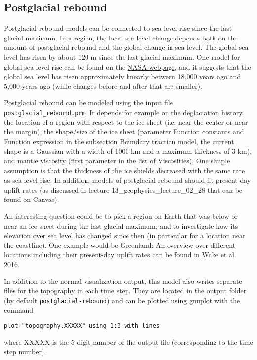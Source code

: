 \documentclass[notitlepage]{article}
\begin{document}
\subsection{Postglacial rebound}

Postglacial rebound models can be connected to sea-level rise since the last glacial maximum. 
In a region, the local sea level change depends both on the amount of postglacial rebound and the global change in sea level. 
The global sea level has risen by about 120 m since the last glacial maximum. One model for global sea level rise
can be found on the \href{https://www.giss.nasa.gov/research/briefs/gornitz_09/}{NASA webpage}, and it suggests that 
the global sea level has risen approximately linearly between 18,000 years ago and 5,000 years ago (while changes before
and after that are smaller). 

Postglacial rebound can be modeled using the input file \texttt{postglacial\_rebound.prm}. 
It depends for example on the deglaciation history, the location of a region with respect to the ice sheet 
(i.e. near the center or near the margin), the shape/size of the ice sheet (parameter Function constants and 
Function expression in the subsection Boundary traction model, the current shape is a Gaussian with a width of 
1000 km and a maximum thickness of 3 km), and mantle viscosity (first parameter in the list of Viscosities). 
One simple assumption is that the thickness of the ice shields decreased with the same rate as sea level rise. 
In addition, models of postglacial rebound should fit present-day uplift rates (as discussed in lecture 
13\_geophysics\_lecture\_02\_28 that can be found on Canvas). 

An interesting question could be to pick a region on Earth that was below or near an ice sheet during the last 
glacial maximum, and to investigate how its elevation over sea level has changed since then (in particular for
a location near the coastline). One example would be Greenland: An overview over different locations including their
present-day uplift rates can be found in \href{https://link.springer.com/article/10.1007/s40641-016-0040-z}{Wake et al. 2016}. 

In addition to the normal visualization output, this model also writes separate files for the topography in each time step. 
They are located in the output folder (by default \texttt{postglacial-rebound}) and can be plotted using gnuplot with the command
\begin{verbatim}
plot "topography.XXXXX" using 1:3 with lines
\end{verbatim} 
where XXXXX is the 5-digit number of the output file (corresponding to the time step number). 
\end{document}
